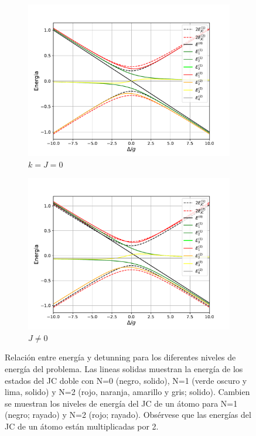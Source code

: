 \begin{figure}
    \centering
    \begin{subfigure}[h]{0.49\textwidth}
        \centering
        \includegraphics[width=\textwidth]{figuras/ch4/relacion_energia_detunning1.pdf}
        \caption{$k=J=0$}
        \label{fig:relación energia detunning 1}
    \end{subfigure}
    \hfill
    \begin{subfigure}[h]{0.49\textwidth}
        \centering
        \includegraphics[width=\textwidth]{figuras/ch4/relacion_energia_detunning2.pdf}
        \caption{$J\neq 0$}
        \label{fig:relación energia detunning 2}
    \end{subfigure}
       \caption{Relación entre energía y detunning para los diferentes niveles de energía del problema. Las lineas solidas muestran la energía de los estados del JC doble con N=0 (negro, solido), N=1 (verde oscuro y lima, solido) y N=2 (rojo, naranja, amarillo y gris; solido). Cambien se muestran los niveles de energía del JC de un átomo para N=1 (negro; rayado) y N=2 (rojo; rayado). Obsérvese que las energías del JC de un átomo están multiplicadas por 2.}
       \label{fig:relación energia detunning}
\end{figure}
